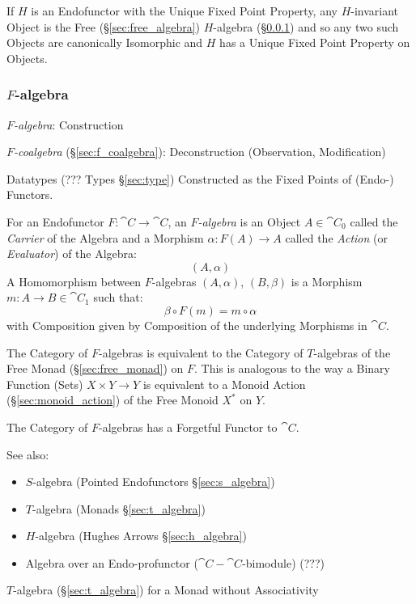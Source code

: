 If $H$ is an Endofunctor with the Unique Fixed Point Property, any
$H$-invariant Object is the Free (\S\ref{sec:free_algebra})
$H$-algebra (\S\ref{sec:f_algebra}) and so any two such Objects are
canonically Isomorphic and $H$ has a Unique Fixed Point Property on
Objects.



\subsubsection{$F$-algebra}\label{sec:f_algebra}

\emph{$F$-algebra}: Construction

\emph{$F$-coalgebra} (\S\ref{sec:f_coalgebra}): Deconstruction
(Observation, Modification)

Datatypes (??? Types \S\ref{sec:type}) Constructed as the Fixed Points
of (Endo-) Functors. \cite{jones95} %

For an Endofunctor $F : \cat{C} \rightarrow \cat{C}$, an
\emph{$F$-algebra} is an Object $A \in \cat{C}_0$ called the
\emph{Carrier} of the Algebra and a Morphism $\alpha : F (A)
\rightarrow A$ called the \emph{Action} (or \emph{Evaluator}) of the
Algebra: \cite{corfield08}
\[
  (A,\alpha)
\]
A Homomorphism between $F$-algebras $(A,\alpha)$, $(B,\beta)$ is a
Morphism $m : A \rightarrow B \in \cat{C}_1$ such that:
\[
  \beta \circ F(m) = m \circ \alpha
\]
with Composition given by Composition of the underlying Morphisms in
$\cat{C}$.

The Category of $F$-algebras is equivalent to the Category of
$T$-algebras of the Free Monad (\S\ref{sec:free_monad}) on $F$. This
is analogous to the way a Binary Function (Sets) $X \times Y
\rightarrow Y$ is equivalent to a Monoid Action
(\S\ref{sec:monoid_action}) of the Free Monoid $X^*$ on $Y$.

The Category of $F$-algebras has a Forgetful Functor to $\cat{C}$.

\fist See also:
\begin{itemize}
  \item $S$-algebra (Pointed Endofunctors \S\ref{sec:s_algebra})
  \item $T$-algebra (Monads \S\ref{sec:t_algebra})
  \item $H$-algebra (Hughes Arrows \S\ref{sec:h_algebra})
  \item Algebra over an Endo-profunctor ($\cat{C}-\cat{C}$-bimodule)
    (???) %
\end{itemize}

$T$-algebra (\S\ref{sec:t_algebra}) for a Monad without Associativity

